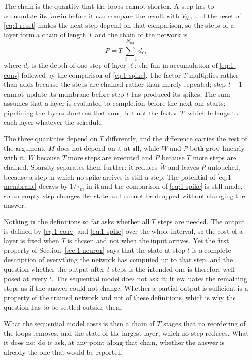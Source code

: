 The chain is the quantity that the loops cannot shorten. A step has to accumulate
its fan-in before it can compare the result with $V_{th}$, and the reset of
\eqref{eq:1-reset} makes the next step depend on that comparison, so the steps of
a layer form a chain of length $T$ and the chain of the network is
\begin{equation}
P = T \sum_{\ell=1}^{N_{\mathrm{lay}}} d_\ell ,
\label{eq:1-path}
\end{equation}
where $d_\ell$ is the depth of one step of layer $\ell$: the fan-in accumulation
of \eqref{eq:1-conv} followed by the comparison of \eqref{eq:1-spike}. The factor
$T$ multiplies rather than adds because the steps are chained rather than merely
repeated; step $t+1$ cannot update its membrane before step $t$ has produced its
spikes. The sum assumes that a layer is evaluated to completion before the next
one starts; pipelining the layers shortens that sum, but not the factor $T$,
which belongs to each layer whatever the schedule.

The three quantities depend on $T$ differently, and the difference carries the
rest of the argument. $M$ does not depend on it at all, while $W$ and $P$ both
grow linearly with it, $W$ because $T$ more steps are executed and $P$ because
$T$ more steps are chained. Sparsity separates them further: it reduces
$\tilde{W}$ and leaves $P$ untouched, because a step in which no spike arrives is
still a step. The potential of \eqref{eq:1-membrane} decays by $1/\tau_m$ in it
and the comparison of \eqref{eq:1-spike} is still made, so an empty step changes
the state and cannot be dropped without changing the answer.

Nothing in the definitions so far asks whether all $T$ steps are needed. The
output is defined by \eqref{eq:1-conv} and \eqref{eq:1-spike} over the whole
interval, so the cost of a layer is fixed when $T$ is chosen and not when the
input arrives. Yet the first
property of Section~\ref{sec:1-neuron} says that the state at step $t$ is a
complete description of everything the network has computed up to that step, and
the question whether the output after $t$ steps is the intended one is therefore
well posed at every $t$. The sequential model does not ask it; it evaluates the
remaining steps as if the answer could not change. Whether a partial output is
sufficient is a property of the trained network and not of these definitions,
which is why the question has to be settled outside them.

What the sequential model costs is then a chain of $T$ stages that no reordering
of the loops removes, and the state of the largest layer, which no step reduces.
What it does not do is ask, at any point along that chain, whether the answer is
already the one that would be reported.
